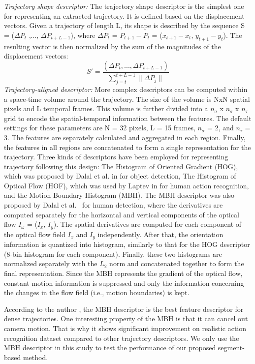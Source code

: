 \textit{Trajectory shape descriptor:} The trajectory shape descriptor is the simplest one for representing an extracted trajectory. It is defined based on the displacement vectors. Given a trajectory of length L, its shape is described by the sequence S = ($\Delta P_{t}$ ,..., $\Delta P_{t+L-1}$), where $\Delta P_{t}$ = $P_{t+1} - P_{t}$ = ($x_{t+1} - x_{t}$, $y_{t+1} - y_{t}$). The resulting vector is then normalized by the sum of the magnitudes of the displacement vectors:
\begin{equation}
S'=\dfrac{(\Delta P_{t},...,\Delta P_{t+L-1})}{\sum_{j=t}^{t+L-1} \|\Delta P_{j}\|}
\end{equation}
\textit{Trajectory-aligned descriptor:} More complex descriptors can be computed within a space-time volume around the trajectory. The size of the volume is NxN spatial pixels and L temporal frames. This volume is further divided into a $n_{\sigma}$ x $n_{\sigma}$ x $n_{\tau}$ grid to encode the spatial-temporal information between the features. The default settings for these parameters are N = 32 pixels, L = 15 frames, $n_{\sigma}$ = 2, and $n_{\tau}$ = 3. The features are separately calculated and aggregated in each region. Finally, the features in all regions are concatenated to form a single representation for the trajectory. Three kinds of descriptors have been employed for representing trajectory following this design: The Histogram of Oriented Gradient (HOG), which was proposed by Dalal et al. in \cite{DBLP:DalalT05} for object detection, The Histogram of Optical Flow (HOF), which was used by Laptev in \cite{Laptev08CVPR} for human action recognition, and the Motion Boundary Histogram (MBH). The MBH descriptor was also proposed by Dalal et al.~\cite{Dalal06ECCV} for human detection, where the derivatives are computed separately for the horizontal and vertical components of the optical flow $I_{\omega}$ = ($I_{x}$, $I_{y}$). The spatial derivatives are computed for each component of the optical flow field $I_{x}$ and $I_{y}$ independently. After that, the orientation information is quantized into histogram, similarly to that for the HOG descriptor (8-bin histogram for each component). Finally, these two histograms are normalized separately with the $L_{2}$ norm and concatenated together to form the final representation. Since the MBH represents the gradient of the optical flow, constant motion information is suppressed and only the information concerning the changes in the flow field (i.e., motion boundaries) is kept.

According to the author \cite{wang:2011:inria-00583818:1}, the MBH descriptor is the best feature descriptor for dense trajectories. One interesting property of the MBH is that it can cancel out camera motion. That is why it shows significant improvement on realistic action recognition dataset compared to other trajectory descriptors. We only use the MBH descriptor in this study to test the performance of our proposed segment-based method.

